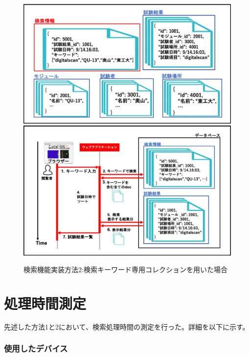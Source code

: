 \begin{figure}[bpt]
  \begin{center}
    \includegraphics[width=16cm]{search_mongo_collection}
    \includegraphics[width=16cm]{search_mongo_collection_flow}
  \caption[検索機能実装方法2:検索キーワード専用コレクションを用いた場合]{検索機能実装方法2:検索キーワード専用コレクションを用いた場合}
  \label{search_mongo_collection}
  \end{center}
\end{figure}

\section{処理時間測定}
先述した方法1と2において、検索処理時間の測定を行った。詳細を以下に示す。


\subsubsection{使用したデバイス}

